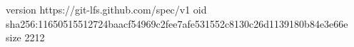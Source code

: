 version https://git-lfs.github.com/spec/v1
oid sha256:11650515512724baacf54969c2fee7afe531552c8130c26d1139180b84e3e66e
size 2212
